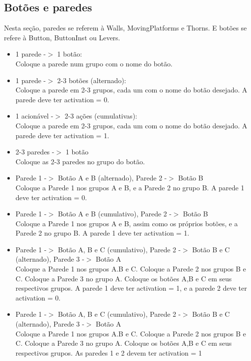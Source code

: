 \documentclass[a4paper, 11pt]{article}
\begin{document}
		\subsection{Botões e paredes}
			Nesta seção, paredes se referem à Walls, MovingPlatforms e Thorns. E botões se refere à Button, ButtonInst ou Levers.
			\begin{itemize}
				\item 1 parede -$>$ 1 botão:
				\\
				Coloque a parede num grupo com o nome do botão.
				\item 1 parede -$>$ 2-3 botões (alternado):
				\\
				Coloque a parede em 2-3 grupos, cada um com o nome do botão desejado.
				A parede deve ter activation = 0.
				\item 1 acionável -$>$ 2-3 ações (cumulativas):
				\\
				Coloque a parede em 2-3 grupos, cada um com o nome do botão desejado.
				A parede deve ter activation = 1.
				\item 2-3 paredes -$>$ 1 botão
				\\
				Coloque as 2-3 paredes no grupo do botão.
				\item Parede 1 -$>$ Botão A e B (alternado), Parede 2 -$>$ Botão B
				\\
				Coloque a Parede 1 nos grupos A e B, e a Parede 2 no grupo B.
				A parede 1 deve ter activation = 0.
				\item Parede 1 -$>$ Botão A e B (cumulativo), Parede 2 -$>$ Botão B
				\\
				Coloque a Parede 1 nos grupos A e B, assim como os próprios botões, e a Parede 2 no grupo B. 
				A parede 1 deve ter activation = 1.
				\item Parede 1 -$>$ Botão A, B e C (cumulativo), Parede 2 -$>$ Botão B e C (alternado), Parede 3 -$>$ Botão A
				\\
				Coloque a Parede 1 nos grupos A.B e C. Coloque a Parede 2 nos grupos B e C. Coloque a Parede 3 no grupo A. Coloque os botões A,B e C em seus respectivos grupos.
				A parede 1 deve ter activation = 1, e a parede 2 deve ter activation = 0.
				\item Parede 1 -$>$ Botão A, B e C (cumulativo), Parede 2 -$>$ Botão B e C (alternado), Parede 3 -$>$ Botão A
				\\
				Coloque a Parede 1 nos grupos A.B e C. Coloque a Parede 2 nos grupos B e C. Coloque a Parede 3 no grupo A. Coloque os botões A,B e C em seus respectivos grupos.
				As paredes 1 e 2 devem ter activation = 1

\end{itemize}
\end{document}
